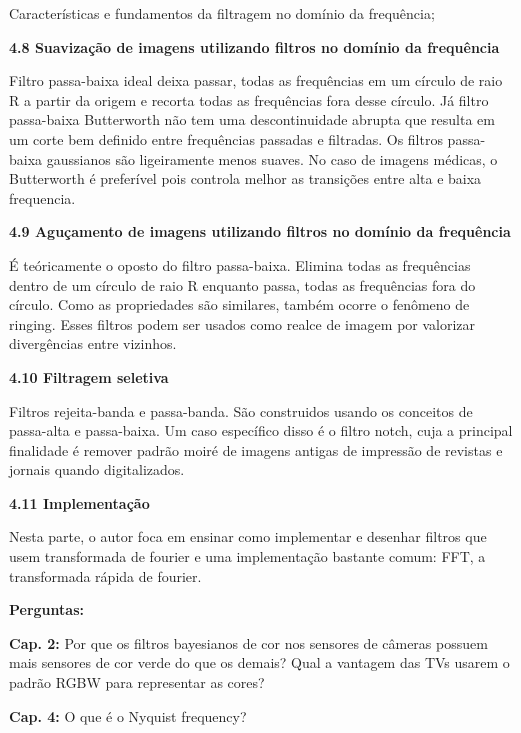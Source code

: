 \documentclass[a4paper]{sbgames}               %
\begin{document}
Características e fundamentos da filtragem no domínio da frequência;

\textbf{4.8 Suavização de imagens utilizando filtros no domínio da frequência}

Filtro passa-baixa ideal deixa passar, todas as frequências em um círculo de raio R a partir da origem e recorta todas as frequências fora desse círculo. Já filtro passa-baixa Butterworth não tem uma descontinuidade abrupta que resulta em um corte bem definido entre frequências passadas e filtradas. Os filtros passa-baixa gaussianos são ligeiramente menos suaves. No caso de imagens médicas, o Butterworth é preferível pois controla melhor as transições entre alta e baixa frequencia.

\textbf{4.9 Aguçamento de imagens utilizando filtros no domínio da frequência}

É teóricamente o oposto do filtro passa-baixa. Elimina todas as frequências dentro de um círculo de raio R enquanto passa, todas as frequências fora do círculo. Como as propriedades são similares, também ocorre o fenômeno de ringing. Esses filtros podem ser usados como realce de imagem por valorizar divergências entre vizinhos. 

\textbf{4.10 Filtragem seletiva}

Filtros rejeita-banda e passa-banda. São construidos usando os conceitos de passa-alta e passa-baixa. Um caso específico disso é o filtro notch, cuja a principal finalidade é remover padrão moiré de imagens antigas de impressão de revistas e jornais quando digitalizados.

\textbf{4.11 Implementação}

Nesta parte, o autor foca em ensinar como implementar e desenhar filtros que usem transformada de fourier e uma implementação bastante comum: FFT, a transformada rápida de fourier.

\pagebreak
\onecolumn
\textbf{Perguntas:}

\textbf{Cap. 2:} Por que os filtros bayesianos de cor nos sensores de câmeras possuem mais sensores de cor verde do que os demais? Qual a vantagem das TVs usarem o padrão RGBW para representar as cores? \cite{li2015design}

\textbf{Cap. 4:} O que é o Nyquist frequency? \cite{tang2016design}



\end{document}

